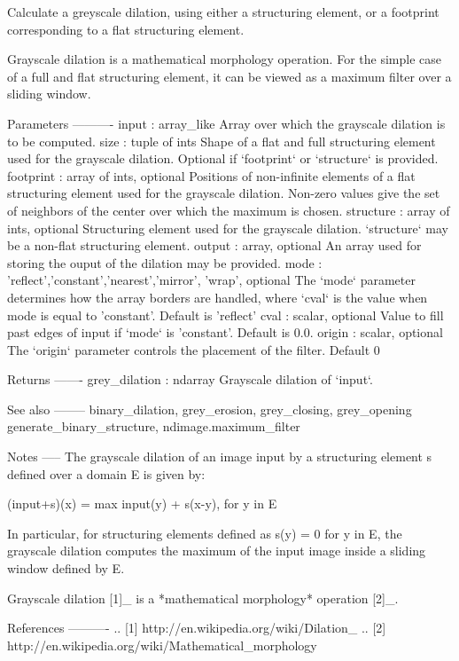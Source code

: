 \begin{DoxyVerb}Calculate a greyscale dilation, using either a structuring element,
or a footprint corresponding to a flat structuring element.

Grayscale dilation is a mathematical morphology operation. For the
simple case of a full and flat structuring element, it can be viewed
as a maximum filter over a sliding window.

Parameters
----------
input : array_like
    Array over which the grayscale dilation is to be computed.
size : tuple of ints
    Shape of a flat and full structuring element used for the grayscale
    dilation. Optional if `footprint` or `structure` is provided.
footprint : array of ints, optional
    Positions of non-infinite elements of a flat structuring element
    used for the grayscale dilation. Non-zero values give the set of
    neighbors of the center over which the maximum is chosen.
structure : array of ints, optional
    Structuring element used for the grayscale dilation. `structure`
    may be a non-flat structuring element.
output : array, optional
    An array used for storing the ouput of the dilation may be provided.
mode : {'reflect','constant','nearest','mirror', 'wrap'}, optional
    The `mode` parameter determines how the array borders are
    handled, where `cval` is the value when mode is equal to
    'constant'. Default is 'reflect'
cval : scalar, optional
    Value to fill past edges of input if `mode` is 'constant'. Default
    is 0.0.
origin : scalar, optional
    The `origin` parameter controls the placement of the filter.
    Default 0

Returns
-------
grey_dilation : ndarray
    Grayscale dilation of `input`.

See also
--------
binary_dilation, grey_erosion, grey_closing, grey_opening
generate_binary_structure, ndimage.maximum_filter

Notes
-----
The grayscale dilation of an image input by a structuring element s defined
over a domain E is given by:

(input+s)(x) = max {input(y) + s(x-y), for y in E}

In particular, for structuring elements defined as
s(y) = 0 for y in E, the grayscale dilation computes the maximum of the
input image inside a sliding window defined by E.

Grayscale dilation [1]_ is a *mathematical morphology* operation [2]_.

References
----------
.. [1] http://en.wikipedia.org/wiki/Dilation_%
.. [2] http://en.wikipedia.org/wiki/Mathematical_morphology


\end{DoxyVerb}
